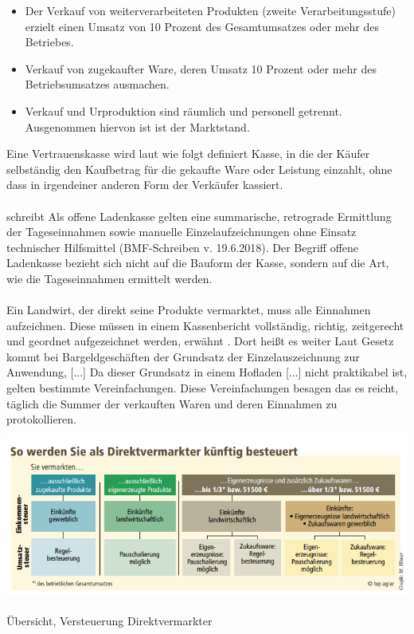 \begin{itemize}
	\item Der Verkauf von weiterverarbeiteten Produkten (zweite Verarbeitungsstufe) erzielt einen Umsatz von 10 Prozent des Gesamtumsatzes oder mehr des Betriebes.
	\item Verkauf von zugekaufter Ware, deren Umsatz 10 Prozent oder mehr des Betriebsumsatzes ausmachen.
	\item Verkauf und Urproduktion sind räumlich und personell getrennt. Ausgenommen hiervon ist ist der Marktstand.
\end{itemize}


Eine Vertrauenskasse wird laut \cite{gesetze5} wie folgt definiert \glqq Kasse, in die der Käufer selbständig den Kaufbetrag für die gekaufte Ware oder Leistung einzahlt, ohne dass in irgendeiner anderen Form der Verkäufer kassiert\grqq{}.
\\
\\
\cite{Bundesministerium} schreibt \glqq Als offene Ladenkasse gelten eine summarische, retrograde Ermittlung der Tageseinnahmen sowie manuelle Einzelaufzeichnungen ohne Einsatz technischer Hilfsmittel (BMF-Schreiben v. 19.6.2018).\grqq{} 
Der Begriff offene Ladenkasse bezieht sich nicht auf die Bauform der Kasse, sondern auf die Art, wie die Tageseinnahmen ermittelt werden.
\\ 
\\
Ein Landwirt, der direkt seine Produkte vermarktet, muss alle Einnahmen aufzeichnen. Diese müssen \glqq in einem Kassenbericht vollständig, richtig, zeitgerecht und geordnet aufgezeichnet werden\grqq{}, erwähnt \cite{gesetze7}. Dort heißt es weiter \glqq Laut Gesetz kommt bei Bargeldgeschäften der Grundsatz der Einzelauszeichnung zur Anwendung, [...] Da dieser Grundsatz in einem Hofladen [...] nicht praktikabel ist, gelten bestimmte Vereinfachungen.\grqq{} Diese Vereinfachungen besagen das es reicht, täglich die Summer der verkauften Waren und deren Einnahmen zu protokollieren.

\begin{table}[htb]
	\centering
	\includegraphics[width=1\textwidth,angle=0]{abb/versteuerung}
	\caption[Übersicht, Versteuerung Direktvermarkter]{Übersicht, Versteuerung Direktvermarkter \cite{gesetze3}}
	\label{fig:versteuerung}
\end{table}


